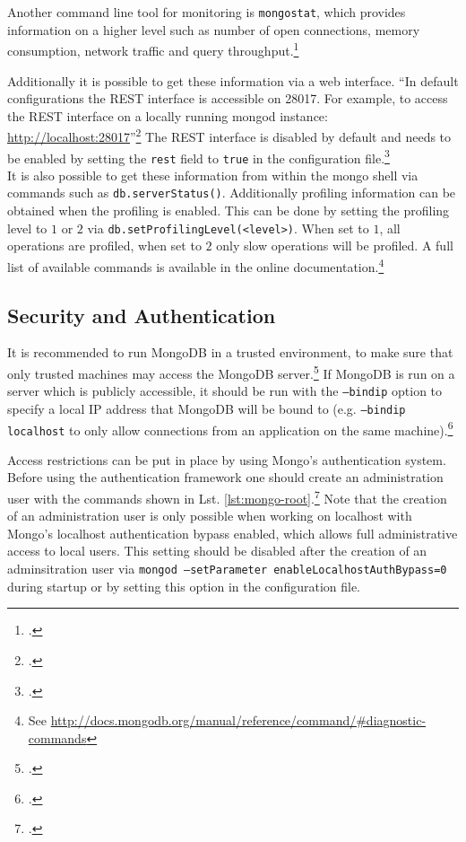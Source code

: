 Another command line tool for monitoring is \texttt{mongostat}, which provides
information on a higher level such as number of open connections,
memory consumption, network traffic and query throughput.\footcite[Cf.][]{mongo_monitoring}

Additionally it is possible to get these information via a web interface.
``In default configurations the REST interface is accessible on 28017. For
example, to access the REST interface on a locally running mongod instance:
\url{http://localhost:28017}''\footcite[][]{mongo_monitoring}
The REST interface is disabled by default and needs to be enabled by setting the
\texttt{rest} field to \texttt{true} in the configuration file.\footcite[Cf.][]{mongo_conf}\\
It is also possible to get these information from within the mongo shell via commands such as
\texttt{db.serverStatus()}. Additionally profiling information can be obtained when the
profiling is enabled. This can be done by setting the profiling level to $1$ or $2$ via
\texttt{db.setProfilingLevel(<level>)}. When set to $1$, all operations are profiled, when set
to $2$ only slow operations will be profiled.
A full list of available commands is available in the online
documentation.\footnote{See \url{http://docs.mongodb.org/manual/reference/command/\#diagnostic-commands}}


\subsection{Security and Authentication}
\label{sec:maintenance-security}
\FloatBarrier
It is recommended to run MongoDB in a trusted environment, to make sure that
only trusted machines may access the MongoDB
server.\footcite[Cf.][118]{Chodorow_2010}
If MongoDB is run on a server which is publicly accessible, it should be
run with the \texttt{--bindip} option to specify a local IP address that MongoDB
will be bound to (e.g. \texttt{--bindip localhost} to only allow
connections from an application on the same
machine).\footcite[Cf.][118]{Chodorow_2010}

Access restrictions can be put in place by using Mongo's authentication system.
Before using the authentication framework one should
create an administration user with the commands shown in Lst.
\ref{lst:mongo-root}.\footcite[Cf.][]{mongo_adminuser} Note that the creation of
an administration user is only possible when working on localhost with Mongo's localhost authentication
bypass enabled, which allows full administrative access to local users.
This setting should be disabled after the creation of an adminsitration user via
\texttt{mongod --setParameter enableLocalhostAuthBypass=0} during startup or by
setting this option in the configuration file.

